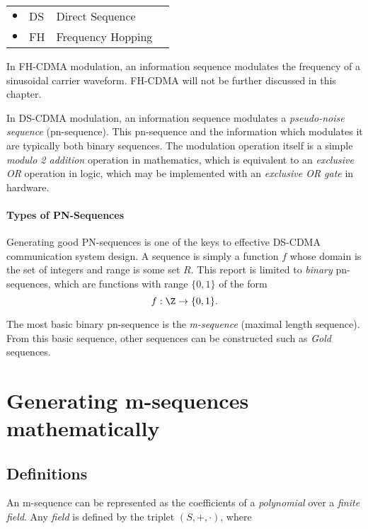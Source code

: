 \begin{tabular}{clll}
   $\bullet$ & DS & Direct Sequence   &  \\
   $\bullet$ & FH & Frequency Hopping &  
\end{tabular}

In FH-CDMA modulation, an information sequence modulates the frequency 
of a sinusoidal carrier waveform.  
FH-CDMA will not be further discussed in this chapter.

In DS-CDMA modulation, an information sequence modulates a 
{\em pseudo-noise sequence} (pn-sequence).
This pn-sequence and the information which modulates it
are typically both binary sequences.
The modulation operation itself is a simple {\em modulo 2 addition} operation in mathematics,
which is equivalent to an {\em exclusive OR} operation in logic,
which may be implemented with an {\em exclusive OR gate} in hardware.

\paragraph{Types of PN-Sequences}
Generating good PN-sequences is one of the keys to effective DS-CDMA 
communication system design.  
A sequence is simply a function $f$ whose domain is the set of integers
and range is some set $R$.
This report is limited to {\em binary} pn-sequences,
which are functions with range $\{0,1\}$ of the form
   \[ f:\Z\to\{0,1\}.  \]

 
The most basic binary pn-sequence is the {\em m-sequence} 
(maximal length sequence).
From this basic sequence, other sequences can be constructed 
such as {\em Gold} sequences.

\section{Generating m-sequences mathematically}
\label{sec:math}
\subsection{Definitions}
\label{sec:def}
An m-sequence can be represented as the coefficients of a {\em polynomial} 
over a {\em finite field}.
Any {\em field} is defined by the triplet $(S,+,\cdot)$,
where 

